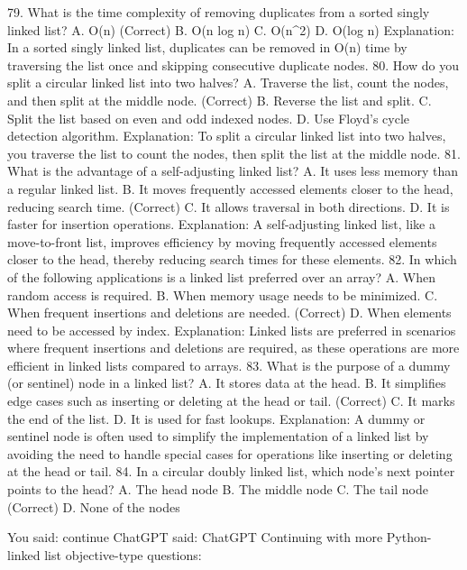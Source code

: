 79. What is the time complexity of removing duplicates from a sorted singly linked list?
A. O(n) (Correct)
B. O(n log n)
C. O(n^2)
D. O(log n)
Explanation: In a sorted singly linked list, duplicates can be removed in O(n) time by traversing the list once and skipping consecutive duplicate nodes.
80. How do you split a circular linked list into two halves?
A. Traverse the list, count the nodes, and then split at the middle node. (Correct)
B. Reverse the list and split.
C. Split the list based on even and odd indexed nodes.
D. Use Floyd’s cycle detection algorithm.
Explanation: To split a circular linked list into two halves, you traverse the list to count the nodes, then split the list at the middle node.
81. What is the advantage of a self-adjusting linked list?
A. It uses less memory than a regular linked list.
B. It moves frequently accessed elements closer to the head, reducing search time. (Correct)
C. It allows traversal in both directions.
D. It is faster for insertion operations.
Explanation: A self-adjusting linked list, like a move-to-front list, improves efficiency by moving frequently accessed elements closer to the head, thereby reducing search times for these elements.
82. In which of the following applications is a linked list preferred over an array?
A. When random access is required.
B. When memory usage needs to be minimized.
C. When frequent insertions and deletions are needed. (Correct)
D. When elements need to be accessed by index.
Explanation: Linked lists are preferred in scenarios where frequent insertions and deletions are required, as these operations are more efficient in linked lists compared to arrays.
83. What is the purpose of a dummy (or sentinel) node in a linked list?
A. It stores data at the head.
B. It simplifies edge cases such as inserting or deleting at the head or tail. (Correct)
C. It marks the end of the list.
D. It is used for fast lookups.
Explanation: A dummy or sentinel node is often used to simplify the implementation of a linked list by avoiding the need to handle special cases for operations like inserting or deleting at the head or tail.
84. In a circular doubly linked list, which node's next pointer points to the head?
A. The head node
B. The middle node
C. The tail node (Correct)
D. None of the nodes





You said:
continue
ChatGPT said:
ChatGPT
Continuing with more Python-linked list objective-type questions:

